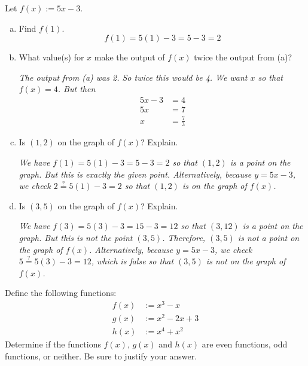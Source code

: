 \documentclass[11pt,letterpaper]{article}
\begin{document}
 Let $f(x):= 5x - 3$.
\begin{enumerate}[(a)]
\item Find $f(1)$. \pvspace{1.3cm}
	\[
	f(1)= 5(1) - 3= 5 - 3= 2
	\] \pvspace{2.1cm}


\item What value(s) for $x$ make the output of $f(x)$ twice the output from (a)? \pspace

{\itshape The output from (a) was 2. So twice this would be 4. We want $x$ so that $f(x)= 4$. But then 
	\[
	\begin{aligned}
	5x - 3&= 4 \\
	5x&= 7 \\
	x&= \frac{7}{3}
	\end{aligned}
	\]
} \pvspace{0.7cm}


\item Is $(1, 2)$ on the graph of $f(x)$? Explain. \pspace

{\itshape We have $f(1)= 5(1) - 3= 5 - 3= 2$ so that $(1, 2)$ is a point on the graph. But this is exactly the given point. Alternatively, because $y= 5x - 3$, we check $2 \stackrel{?}{=} 5(1) - 3= 2$ so that $(1, 2)$ is on the graph of $f(x)$.} \pvspace{2.5cm}


\item Is $(3, 5)$ on the graph of $f(x)$? Explain. \pspace

{\itshape We have $f(3)= 5(3) - 3= 15 - 3= 12$ so that $(3, 12)$ is a point on the graph. But this is not the point $(3, 5)$. Therefore, $(3, 5)$ is not a point on the graph of $f(x)$. Alternatively, because $y= 5x - 3$, we check $5 \stackrel{?}{=} 5(3) - 3= 12$, which is false so that $(3, 5)$ is not on the graph of $f(x)$.}
\end{enumerate}





\newpage





 Define the following functions:
	\[
	\begin{aligned}
	f(x)&:= x^3 - x \\
	g(x)&:= x^2 - 2x + 3 \\
	h(x)&:= x^4 + x^2
	\end{aligned}
	\]
Determine if the functions $f(x)$, $g(x)$ and $h(x)$ are even functions, odd functions, or neither. Be sure to justify your answer. \pspace
\end{document}
